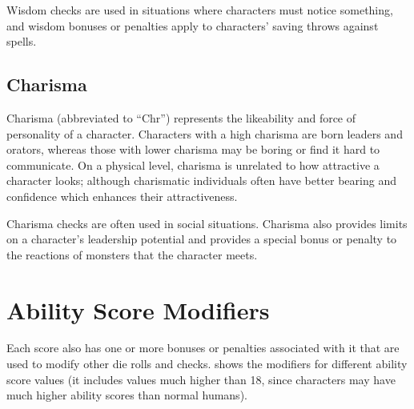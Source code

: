 \begin{multicols*}{2}
Wisdom checks are used in situations where characters must notice something, and wisdom bonuses or penalties apply to characters’ saving throws against spells.

\subsection{Charisma}\label{sec:Charisma}
Charisma (abbreviated to “Chr”) represents the likeability and force of personality of a character. Characters with a high charisma are born leaders and orators, whereas those with lower charisma may be boring or find it hard to communicate. On a physical level, charisma is unrelated to how attractive a character looks; although charismatic individuals often have better bearing and confidence which enhances their attractiveness.

Charisma checks are often used in social situations. Charisma also provides limits on a character’s leadership potential and provides a special bonus or penalty to the reactions of monsters that the character meets.

\section{Ability Score Modifiers}
Each score also has one or more bonuses or penalties associated with it that are used to modify other die rolls and checks.  shows the modifiers for different ability score values (it includes values much higher than 18, since  characters may have much higher ability scores than normal humans).


\end{multicols*}
